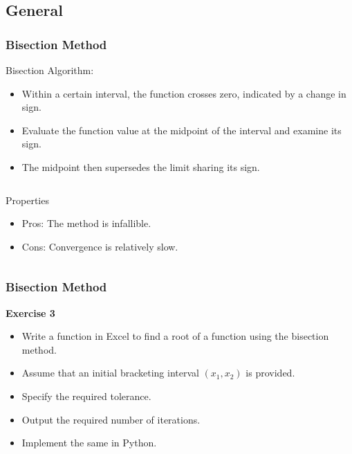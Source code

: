 \subsection*{General}
\begin{frame}[fragile]
  \frametitle{Bisection Method}

  Bisection Algorithm:
  \begin{itemize}
    \item Within a certain interval, the function crosses zero, indicated by a change in sign.
    \item Evaluate the function value at the midpoint of the interval and examine its sign.
    \item The midpoint then supersedes the limit sharing its sign.
  \end{itemize}

  \begin{columns}
    \vspace{0.5cm}
    \centering
    

    \begin{block}{Properties}
      \begin{itemize}
        \item Pros: The method is infallible.
        \item Cons: Convergence is relatively slow.
      \end{itemize}
    \end{block}
  \end{columns}
\end{frame}


\begin{frame}[fragile]
  \frametitle{Bisection Method}

  \textbf{Exercise 3}
  \begin{itemize}
    \item Write a function in Excel to find a root of a function using the bisection method.
    \item Assume that an initial bracketing interval \((x_1, x_2)\) is provided.
    \item Specify the required tolerance.
    \item Output the required number of iterations.
    \item Implement the same in Python.
  \end{itemize}
\end{frame}

